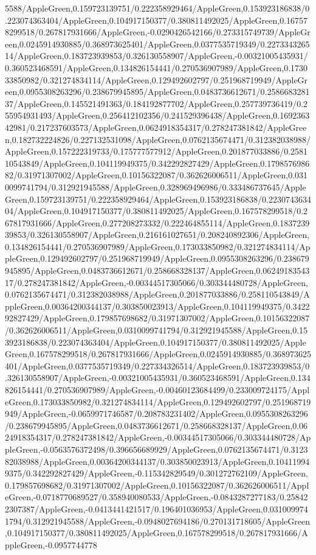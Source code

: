 {\begin{tikzternal}
{5588/AppleGreen,0.159723139751/0.222358929464/AppleGreen,0.153923186838/0.223074363404/AppleGreen,0.104917150377/0.380811492025/AppleGreen,0.167578299518/0.267817931666/AppleGreen,-0.0290426542166/0.273315749739/AppleGreen,0.0245914930885/0.368973625401/AppleGreen,0.0377535719349/0.227334326514/AppleGreen,0.183723939853/0.326130558907/AppleGreen,-0.00321005435931/0.360523468591/AppleGreen,0.134826154441/0.270536907989/AppleGreen,0.173033850982/0.321274834114/AppleGreen,0.129492602797/0.251968719949/AppleGreen,0.0955308263296/0.238679945895/AppleGreen,0.0483736612671/0.258668328137/AppleGreen,0.145521491363/0.184192877702/AppleGreen,0.257739736419/0.255954931493/AppleGreen,0.256412102356/0.241529396438/AppleGreen,0.169236342981/0.217237603573/AppleGreen,0.0624918354317/0.278247381842/AppleGreen,0.182732224826/0.227132531098/AppleGreen,0.0762135674471/0.312382038988/AppleGreen,0.157222319733/0.175777577912/AppleGreen,0.201877033886/0.258110543849/AppleGreen,0.104119949375/0.342292827429/AppleGreen,0.179857698682/0.31971307002/AppleGreen,0.10156322087/0.362626006511/AppleGreen,0.0310099741794/0.312921945588/AppleGreen,0.328969496986/0.333486737645/AppleGreen,0.159723139751/0.222358929464/AppleGreen,0.153923186838/0.223074363404/AppleGreen,0.104917150377/0.380811492025/AppleGreen,0.167578299518/0.267817931666/AppleGreen,0.277208273332/0.222464855114/AppleGreen,0.183723939853/0.326130558907/AppleGreen,0.216161027651/0.208240892306/AppleGreen,0.134826154441/0.270536907989/AppleGreen,0.173033850982/0.321274834114/AppleGreen,0.129492602797/0.251968719949/AppleGreen,0.0955308263296/0.238679945895/AppleGreen,0.0483736612671/0.258668328137/AppleGreen,0.0624918354317/0.278247381842/AppleGreen,-0.00344517305066/0.303344480728/AppleGreen,0.0762135674471/0.312382038988/AppleGreen,0.201877033886/0.258110543849/AppleGreen,0.00364200344137/0.303850023913/AppleGreen,0.104119949375/0.342292827429/AppleGreen,0.179857698682/0.31971307002/AppleGreen,0.10156322087/0.362626006511/AppleGreen,0.0310099741794/0.312921945588/AppleGreen,0.153923186838/0.223074363404/AppleGreen,0.104917150377/0.380811492025/AppleGreen,0.167578299518/0.267817931666/AppleGreen,0.0245914930885/0.368973625401/AppleGreen,0.0377535719349/0.227334326514/AppleGreen,0.183723939853/0.326130558907/AppleGreen,-0.00321005435931/0.360523468591/AppleGreen,0.134826154441/0.270536907989/AppleGreen,-0.00460123684499/0.233009724175/AppleGreen,0.173033850982/0.321274834114/AppleGreen,0.129492602797/0.251968719949/AppleGreen,-0.0659971746587/0.208783231402/AppleGreen,0.0955308263296/0.238679945895/AppleGreen,0.0483736612671/0.258668328137/AppleGreen,0.0624918354317/0.278247381842/AppleGreen,-0.00344517305066/0.303344480728/AppleGreen,-0.0563576372498/0.396656689929/AppleGreen,0.0762135674471/0.312382038988/AppleGreen,0.00364200344137/0.303850023913/AppleGreen,0.104119949375/0.342292827429/AppleGreen,-0.115342829549/0.301272762109/AppleGreen,0.179857698682/0.31971307002/AppleGreen,0.10156322087/0.362626006511/AppleGreen,-0.0718770689527/0.358940080533/AppleGreen,-0.0843287277183/0.258422307387/AppleGreen,-0.0413441421517/0.196401036953/AppleGreen,0.0310099741794/0.312921945588/AppleGreen,-0.0948027694186/0.270131718605/AppleGreen,0.104917150377/0.380811492025/AppleGreen,0.167578299518/0.267817931666/AppleGreen,-0.0957744778}
\end{tikzternal}}
